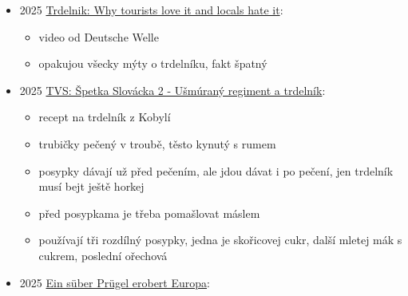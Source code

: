 \begin{itemize}
  \begin{itemize}
  \tightlist
  \item
    blogovej článek o tom, že trdelník už vlastně je tradiční
  \end{itemize}
\item
  2025 \href{https://www.youtube.com/watch?v=qUezTWRfAMc}{Trdelnik: Why
  tourists love it and locals hate it}:

  \begin{itemize}
  \tightlist
  \item
    video od Deutsche Welle
  \item
    opakujou všecky mýty o trdelníku, fakt špatný
  \end{itemize}
\item
  2025 \href{https://www.youtube.com/watch?v=cw2WAJ3Pyvs}{TVS: Špetka
  Slovácka 2 - Ušmúraný regiment a trdelník}:

  \begin{itemize}
  \tightlist
  \item
    recept na trdelník z Kobylí
  \item
    trubičky pečený v troubě, těsto kynutý s rumem
  \item
    posypky dávají už před pečením, ale jdou dávat i po pečení, jen
    trdelník musí bejt ještě horkej
  \item
    před posypkama je třeba pomašlovat máslem
  \item
    používají tři rozdílný posypky, jedna je skořicovej cukr, další
    mletej mák s cukrem, poslední ořechová
  \end{itemize}
\item
  2025
  \href{https://www.pressreader.com/germany/sachsische-zeitung-rodertal/20250815/282089167858541}{Ein
  süber Prügel erobert Europa}:


\end{itemize}

